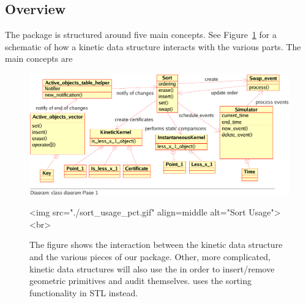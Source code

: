 \subsection{Overview \label{sec:overview}}

The package is structured around five main concepts. See
Figure~\ref{fig:kds_uml_usage} for a schematic of how a kinetic data
structure interacts with the various parts. The main concepts are
 
\begin{figure}
\begin{ccTexOnly}
\begin{center}
\includegraphics[scale=.8,viewport=0 18 470 250, clip]{Kinetic_data_structures/sort_usage_pct}
\end{center}
\end{ccTexOnly}
\begin{ccHtmlOnly}
<img src="./sort_usage_pct.gif" align=middle alt="Sort Usage"><br>
\end{ccHtmlOnly}
\caption{\label{fig:kds_uml_usage} The figure shows the interaction between
  the  kinetic data structure and
  the various pieces of our package.  Other, more complicated, kinetic
  data structures will also use the  in order
  to insert/remove geometric primitives and audit
  themselves.  uses the sorting
  functionality in STL instead.}
\end{figure}


